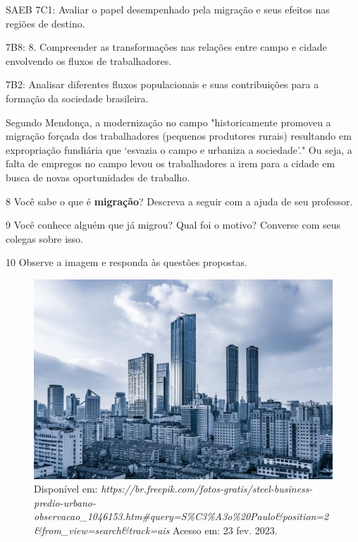 \begin{itemize}
\begin{itemize}
\begin{itemize}
\begin{itemize}
{{\begin{itemize}
\begin{itemize}
{SAEB 7C1: Avaliar o papel desempenhado pela migração e seus efeitos nas
regiões de destino.

7B8: 8. Compreender as transformações nas relações entre campo e cidade
envolvendo os fluxos de trabalhadores.

7B2: Analisar diferentes fluxos populacionais e suas contribuições para
a formação da sociedade brasileira.}

Segundo Mendonça, a modernização no campo "historicamente promoveu a
migração forçada dos trabalhadores (pequenos produtores rurais)
resultando em expropriação fundiária que `esvazia o campo e urbaniza a
sociedade'." Ou seja, a falta de empregos no campo levou os
trabalhadores a irem para a cidade em busca de novas oportunidades de
trabalho.


\num{8} Você sabe o que é \textbf{migração}? Descreva a seguir com a ajuda de seu professor.


\num{9} Você conhece alguém que já migrou? Qual foi o motivo? Converse com seus
colegas sobre isso.


\num{10} Observe a imagem e responda às questões propostas.

\begin{figure}[htpb!]
\includegraphics[width=.5\textwidth]{./imgs/img59.png}
\caption{Disponível em: \emph{https://br.freepik.com/fotos-gratis/steel-business-predio-urbano-observacao\_1046153.htm\#query=S\%C3\%A3o\%20Paulo\&position=2\&from\_view=search\&track=ais} Acesso em: 23 fev. 2023.}
\end{figure}


\end{itemize}
\end{itemize}}}
\end{itemize}
\end{itemize}
\end{itemize}
\end{itemize}

